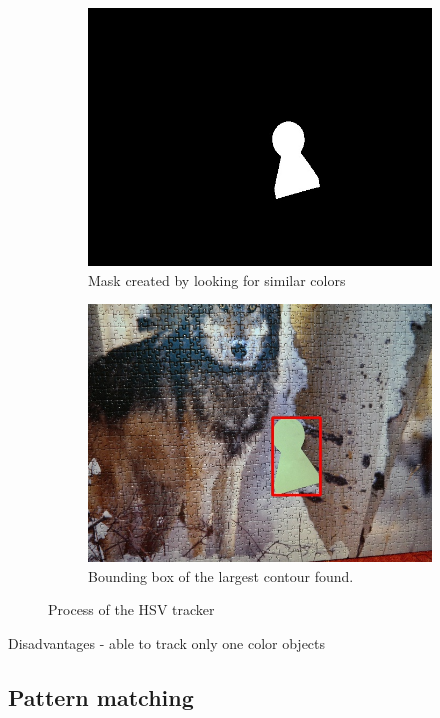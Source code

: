 \begin{figure}
\begin{subfigure}[b]{0.48\linewidth}
    \includegraphics[width=\linewidth]{img/hsv/mask.jpg}
    \caption{Mask created by looking for similar colors}
  \end{subfigure}
  \begin{subfigure}[b]{0.48\linewidth}
    \includegraphics[width=\linewidth]{img/hsv/result.jpg}
    \caption{Bounding box of the largest contour found.}
  \end{subfigure}
  \caption{Process of the HSV tracker}
  \label{fig:hsv-tracker}
\end{figure}

Disadvantages
- able to track only one color objects

\subsection {Pattern matching}

